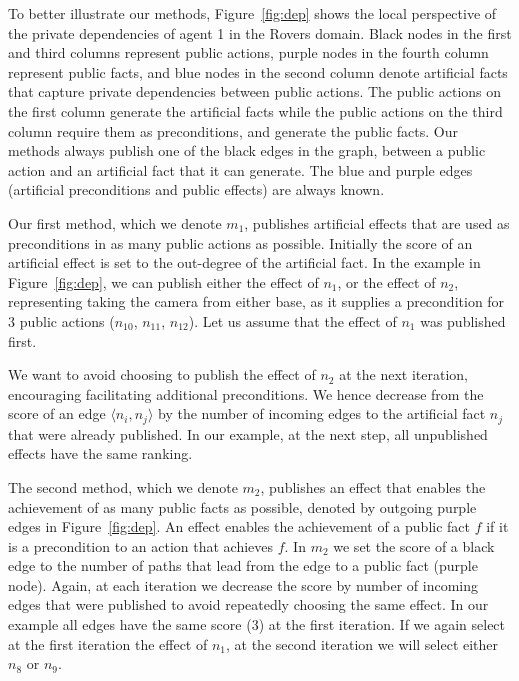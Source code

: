 \documentclass{article}
\newcommand{\rotem}[1]{\textbf{\color{red}[ROTEM:#1]}}
\newcommand{\guy}[1]{\textbf{\color{orange}[GUY:#1]}}
\theoremstyle{remark}
\begin{document}
To better illustrate our methods, Figure~\ref{fig:dep} shows the local perspective of the private dependencies of agent 1 in the Rovers domain. Black nodes in the first and third columns represent public actions, purple nodes in the fourth column represent public facts, and blue nodes in the second column denote artificial facts that capture private dependencies between public actions. 
The public actions on the first column generate the artificial facts while the public actions on the third column require them as preconditions, and generate the public facts. Our methods always publish one of the black edges in the graph, between a public action and an artificial fact that it can generate.  The blue and purple edges (artificial preconditions and public effects) are always known.






Our first method, which we denote $m_1$, publishes artificial effects that are used as preconditions in as many public actions as possible. Initially the score of an artificial effect is set to the out-degree of the artificial fact. In the example in Figure~\ref{fig:dep}, we can publish either the effect of $n_1$, or the effect of $n_2$, representing taking the camera from either base, as it supplies a precondition for 3 public actions ($n_{10}$, $n_{11}$, $n_{12}$). Let us assume that the effect of $n_1$ was published first. 

We want to avoid choosing to publish the effect of $n_2$ at the next iteration, encouraging facilitating additional preconditions. We hence decrease from the score of an edge $\langle n_i, n_j \rangle$ by the number of incoming edges to the artificial fact $n_j$ that were already published. In our example, at the next step, all unpublished effects have the same ranking.


The second method, which we denote $m_2$, publishes an effect that  enables the achievement of as many public facts as possible, denoted by outgoing purple edges in Figure~\ref{fig:dep}. An effect enables the achievement of a public fact $f$ if it is a precondition to an action that achieves $f$. 
In $m_2$ we set the score of a black edge to the number of paths that lead from the edge to a public fact (purple node).
Again, at each iteration we decrease the score by number of incoming  edges that were published to avoid repeatedly choosing the same effect.
In our example all edges have the same score (3) at the first iteration.
If we again select at the first iteration the effect of $n_1$, at the second iteration we will select either $n_8$ or $n_9$.
\end{document}
